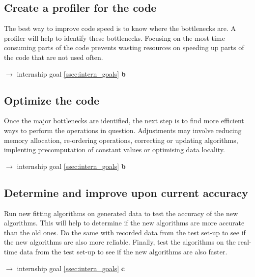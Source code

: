 \subsection{Create a profiler for the code} \label{ssec:profiler}
The best way to improve code speed is to know where the bottlenecks are. A profiler will help to identify these bottlenecks. Focusing
on the most time consuming parts of the code prevents wasting resources on speeding up parts of the code that are not used often.
\begin{flushright}
    $\rightarrow$ internship goal \ref{ssec:intern_goals} \textbf{b}
\end{flushright}

\subsection{Optimize the code} \label{ssec:optimize_code}
Once the major bottlenecks are identified, the next step is to find more efficient ways to perform the operations in question. Adjustments
may involve reducing memory allocation, re-ordering operations, correcting or updating algorithms, implenting precomputation of constant values
or optimising data locality.
\begin{flushright}
    $\rightarrow$ internship goal \ref{ssec:intern_goals} \textbf{b}
\end{flushright}

\subsection{Determine and improve upon current accuracy} \label{ssec:test_accuracy}
Run new fitting algorithms on generated data to test the accuracy of the new algorithms.
This will help to determine if the new algorithms are more accurate than the old ones. Do the same
with recorded data from the test set-up to see if the new algorithms are also more reliable. Finally,
test the algorithms on the real-time data from the test set-up to see if the new algorithms are also faster.
\begin{flushright}
    $\rightarrow$ internship goal \ref{ssec:intern_goals} \textbf{c}
\end{flushright}

